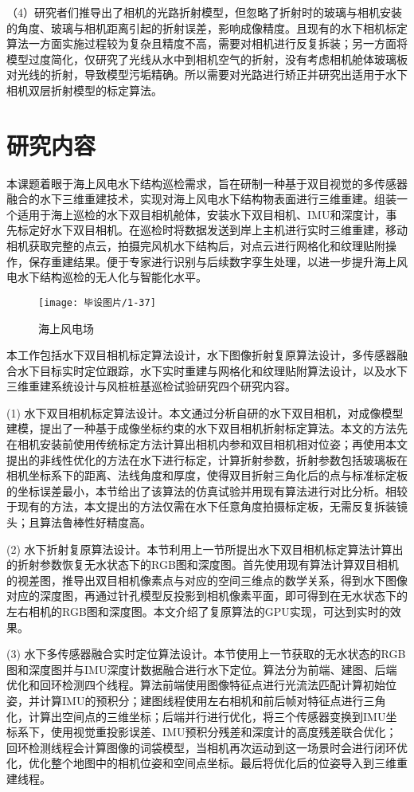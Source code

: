 （4）研究者们推导出了相机的光路折射模型，但忽略了折射时的玻璃与相机安装的角度、玻璃与相机距离引起的折射误差，影响成像精度。且现有的水下相机标定算法一方面实施过程较为复杂且精度不高，需要对相机进行反复拆装；另一方面将模型过度简化，仅研究了光线从水中到相机空气的折射，没有考虑相机舱体玻璃板对光线的折射，导致模型污垢精确。所以需要对光路进行矫正并研究出适用于水下相机双层折射模型的标定算法。

\section{研究内容}
本课题着眼于海上风电水下结构巡检需求，旨在研制一种基于双目视觉的多传感器融合的水下三维重建技术，实现对海上风电水下结构物表面进行三维重建。组装一个适用于海上巡检的水下双目相机舱体，安装水下双目相机、IMU和深度计，事先标定好水下双目相机。在巡检时将数据发送到岸上主机进行实时三维重建，移动相机获取完整的点云，拍摄完风机水下结构后，对点云进行网格化和纹理贴附操作，保存重建结果。便于专家进行识别与后续数字孪生处理，以进一步提升海上风电水下结构巡检的无人化与智能化水平。

\begin{figure}[htbp]
    \centering
    \texttt{[image: 毕设图片/1-37]}
    \caption{\label{fig:1-37}海上风电场\cite{海上风电场}}
\end{figure}

本工作包括水下双目相机标定算法设计，水下图像折射复原算法设计，多传感器融合水下目标实时定位跟踪，水下实时重建与网格化和纹理贴附算法设计，以及水下三维重建系统设计与风桩桩基巡检试验研究四个研究内容。

(1) 水下双目相机标定算法设计。本文通过分析自研的水下双目相机，对成像模型建模，提出了一种基于成像坐标约束的水下双目相机折射标定算法。本文的方法先在相机安装前使用传统标定方法计算出相机内参和双目相机相对位姿；再使用本文提出的非线性优化的方法在水下进行标定，计算折射参数，折射参数包括玻璃板在相机坐标系下的距离、法线角度和厚度，使得双目折射三角化后的点与标准标定板的坐标误差最小，本节给出了该算法的仿真试验并用现有算法进行对比分析。相较于现有的方法，本文提出的方法仅需在水下任意角度拍摄标定板，无需反复拆装镜头；且算法鲁棒性好精度高。

(2) 水下折射复原算法设计。本节利用上一节所提出水下双目相机标定算法计算出的折射参数恢复无水状态下的RGB图和深度图。首先使用现有算法计算双目相机的视差图，推导出双目相机像素点与对应的空间三维点的数学关系，得到水下图像对应的深度图，再通过针孔模型反投影到相机像素平面，即可得到在无水状态下的左右相机的RGB图和深度图。本文介绍了复原算法的GPU实现，可达到实时的效果。

(3) 水下多传感器融合实时定位算法设计。本节使用上一节获取的无水状态的RGB图和深度图并与IMU深度计数据融合进行水下定位。算法分为前端、建图、后端优化和回环检测四个线程。算法前端使用图像特征点进行光流法匹配计算初始位姿，并计算IMU的预积分；建图线程使用左右相机和前后帧对特征点进行三角化，计算出空间点的三维坐标；后端并行进行优化，将三个传感器变换到IMU坐标系下，使用视觉重投影误差、IMU预积分残差和深度计的高度残差联合优化；回环检测线程会计算图像的词袋模型，当相机再次运动到这一场景时会进行闭环优化，优化整个地图中的相机位姿和空间点坐标。最后将优化后的位姿导入到三维重建线程。

